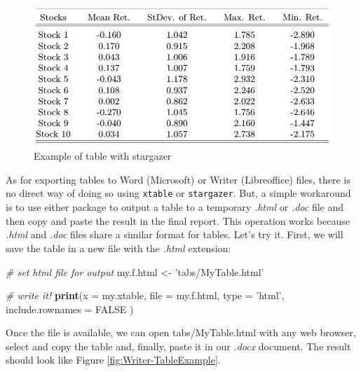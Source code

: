 \documentclass[11pt,]{book}
\newenvironment{Shaded}{\begin{snugshade}}{\end{snugshade}}
\newcommand{\KeywordTok}[1]{\textcolor[rgb]{0.27,0.27,0.27}{\textbf{#1}}}
\newcommand{\DataTypeTok}[1]{\textcolor[rgb]{0.27,0.27,0.27}{#1}}
\newcommand{\StringTok}[1]{\textcolor[rgb]{0.5,0.5,0.5}{#1}}
\newcommand{\CommentTok}[1]{\textcolor[rgb]{0.56,0.35,0.01}{\textit{#1}}}
\newcommand{\OtherTok}[1]{\textcolor[rgb]{0.56,0.35,0.01}{#1}}
\newcommand{\NormalTok}[1]{#1}
\begin{document}
\begin{figure}[!htbp]

{\centering \includegraphics[width=0.75\linewidth]{tabs/table-4-3} 

}

\caption{Example of table with stargazer}\label{fig:table-stargazer}
\end{figure}

As for exporting tables to Word (Microsoft) or Writer (Libreoffice)
files, there is no direct way of doing so using \texttt{xtable} or
\texttt{stargazer}. But, a simple workaround is to use either package to
output a table to a temporary \emph{.html} or \emph{.doc} file and then
copy and paste the result in the final report. This operation works
because \emph{.html} and \emph{.doc} files share a similar format for
tables. Let's try it. First, we will save the table in a new file with
the \emph{.html} extension:

\begin{Shaded}
\begin{Highlighting}[]
\CommentTok{# set html file for output}
\NormalTok{my.f.html <-}\StringTok{ 'tabs/MyTable.html'}

\CommentTok{# write it!}
\KeywordTok{print}\NormalTok{(}\DataTypeTok{x =}\NormalTok{ my.xtable,}
      \DataTypeTok{file =}\NormalTok{ my.f.html,}
      \DataTypeTok{type =} \StringTok{'html'}\NormalTok{,}
      \DataTypeTok{include.rownames =} \OtherTok{FALSE}\NormalTok{ )}
\end{Highlighting}
\end{Shaded}

Once the file is available, we can open tabs/MyTable.html with any web
browser, select and copy the table and, finally, paste it in our
\emph{.docx} document. The result should look like Figure
\ref{fig:Writer-TableExample}.
\end{document}
